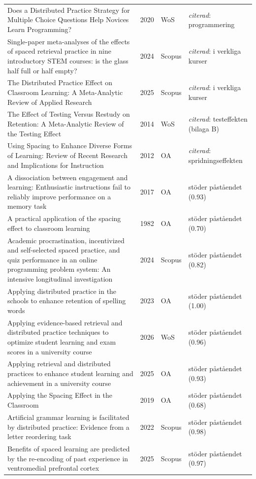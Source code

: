 \begin{longtable}{@{}%
  >{\raggedright\arraybackslash}p{}c%
  >{\raggedright\arraybackslash}p{}%
  >{\raggedright\arraybackslash}p{}@{}}
Does a Distributed Practice Strategy for Multiple Choice Questions Help Novices Learn Programming? & 2020 & WoS & \emph{citerad}: programmering \\
Single-paper meta-analyses of the effects of spaced retrieval practice in nine introductory STEM courses: is the glass half full or half empty? & 2024 & Scopus & \emph{citerad}: i verkliga kurser \\
The Distributed Practice Effect on Classroom Learning: A Meta-Analytic Review of Applied Research & 2025 & Scopus & \emph{citerad}: i verkliga kurser \\
The Effect of Testing Versus Restudy on Retention: A Meta-Analytic Review of the Testing Effect & 2014 & WoS & \emph{citerad}: testeffekten (bilaga B) \\
Using Spacing to Enhance Diverse Forms of Learning: Review of Recent Research and Implications for Instruction & 2012 & OA & \emph{citerad}: spridningseffekten \\
A dissociation between engagement and learning: Enthusiastic instructions fail to reliably improve performance on a memory task & 2017 & OA & stöder påståendet (0.93) \\
A practical application of the spacing effect to classroom learning & 1982 & OA & stöder påståendet (0.70) \\
Academic procrastination, incentivized and self-selected spaced practice, and quiz performance in an online programming problem system: An intensive longitudinal investigation & 2024 & Scopus & stöder påståendet (0.82) \\
Applying distributed practice in the schools to enhance retention of spelling words & 2023 & OA & stöder påståendet (1.00) \\
Applying evidence-based retrieval and distributed practice techniques to optimize student learning and exam scores in a university course & 2026 & WoS & stöder påståendet (0.96) \\
Applying retrieval and distributed practices to enhance student learning and achievement in a university course & 2025 & OA & stöder påståendet (0.93) \\
Applying the Spacing Effect in the Classroom & 2019 & OA & stöder påståendet (0.68) \\
Artificial grammar learning is facilitated by distributed practice: Evidence from a letter reordering task & 2022 & Scopus & stöder påståendet (0.98) \\
Benefits of spaced learning are predicted by the re-encoding of past experience in ventromedial prefrontal cortex & 2025 & Scopus & stöder påståendet (0.97) \\

\end{longtable}
